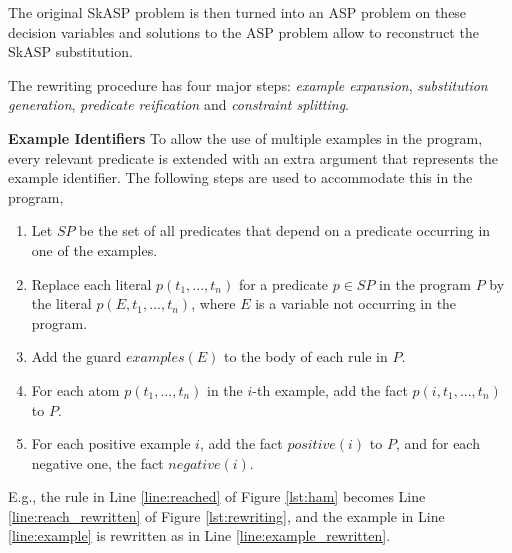 The original SkASP problem is then turned into an ASP problem  
on these decision variables and solutions to the ASP problem allow to reconstruct the SkASP substitution.


The rewriting procedure has four major steps: \textit{example expansion}, \textit{substitution generation}, \textit{predicate reification} and \textit{constraint splitting}.  

\vspace{3pt}
\textbf{Example Identifiers} 
To allow the use of multiple examples in the program, every relevant predicate is extended with
an extra argument that represents the example identifier.  The following steps are used
to accommodate this in the program,
\begin{enumerate}
\item
  Let $\textit{SP}$ be the set of all predicates that depend on a predicate occurring in one of the examples. 
\item
  Replace each literal $p(t_1, ...,t_n)$ for a predicate $p \in \textit{SP}$ in the program $P$ by 
the literal $p(E,t_1, ...,t_n)$, where $E$ is a variable not occurring in the program. 
\item
  Add the guard $\textit{examples}(E)$ to the body of each rule in $P$.\
\item
For each atom $p(t_1,...,t_n)$ in the $i$-th example, add the fact $p(i,t_1,...,t_n)$ to $P$.
\item
  For each positive example $i$, add the fact $\textit{positive}(i)$ to $P$, and for each negative one, the fact $\textit{negative}(i)$.
\end{enumerate}
E.g., the rule in Line \ref{line:reached} of Figure \ref{lst:ham} becomes Line \ref{line:reach_rewritten} of Figure \ref{lst:rewriting}, and the example in Line \ref{line:example} is rewritten as in Line \ref{line:example_rewritten}.



